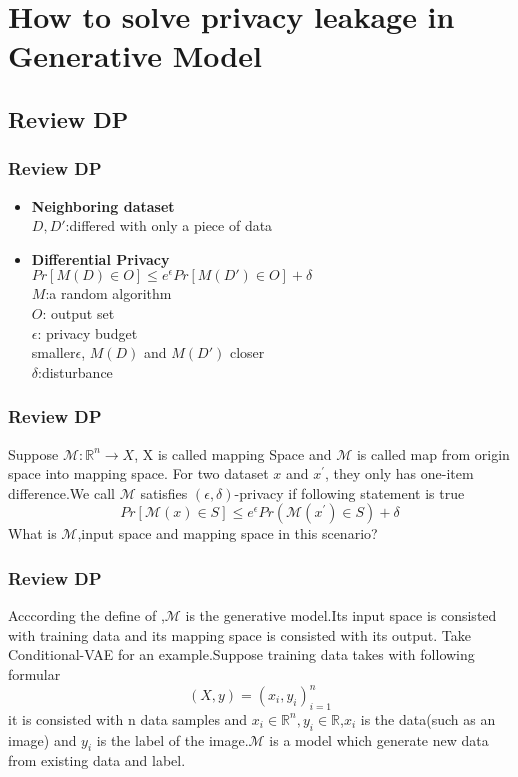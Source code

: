 \documentclass{beamer}
\newcommand{\R}{\mathbb{R}}
\begin{document}
\section{How to solve privacy leakage in Generative Model}
\subsection{Review DP}
\begin{frame}
\frametitle{Review DP}
    \begin{itemize}
        \item \textbf{Neighboring dataset}\\[5pt]
        $D, D'$:differed with only a piece of data\\[20pt]
        \item \textbf{Differential Privacy}\\[5pt]
        $Pr[M(D) \in O] \leq e^{\epsilon}Pr[M(D') \in O] + \delta$\\[5pt]
        $M$:a random algorithm\\
        $O$: output set\\
        $\epsilon$: privacy budget\\
        \quad smaller$\epsilon$, $M(D)$ and $M(D')$ closer\\
        $\delta$:disturbance\\
    \end{itemize}
\end{frame}

\begin{frame}
\frametitle{Review DP}
    Suppose $\mathcal{M}:\R^n\to X$,
    X is called mapping Space and $\mathcal M$
     is called map from origin space into mapping space.
     For two dataset $x$ and $x^\prime$, they only has one-item difference.We call $\mathcal M$ satisfies $(\epsilon,\delta)$-privacy if following statement is true
     \begin{equation}
      Pr[\mathcal{M}(x)\in S] \leq e^{\epsilon}  Pr(\mathcal M(x^\prime )\in  S) +\delta
     \end{equation}
     What is $\mathcal M$,input space and mapping space in this scenario?
\end{frame}

\begin{frame}
\frametitle{Review DP}
  Acccording the define of \cite{ref1},$\mathcal{M}$ is the generative model.Its input space is consisted with training data and its mapping space is consisted with its output.
  Take Conditional-VAE for an example.Suppose training data takes with following formular
  \begin{equation}
    (X,y) = {(x_i,y_i)}_{i=1}^n
  \end{equation}
  it is consisted with n data samples and $x_i\in \R^n,y_i\in \R$,$x_i$ is the data(such as an image) and $y_i$ is the label of the image.$\mathcal M$ is a model which generate new data from existing data and label.

\end{frame}
\end{document}
